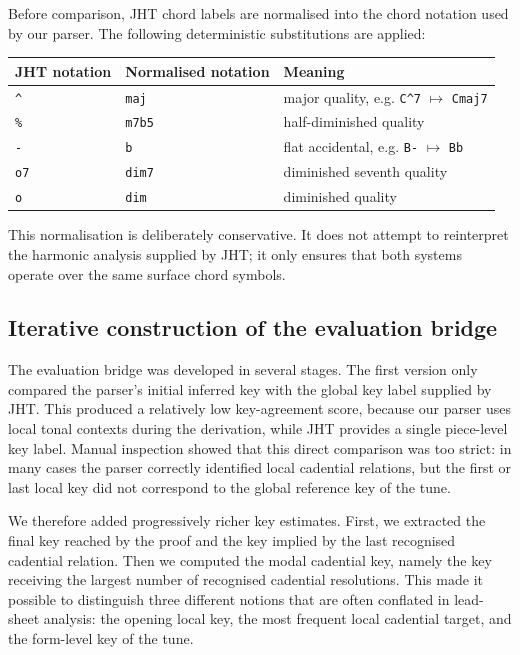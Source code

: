 Before comparison, JHT chord labels are normalised into the chord notation used
by our parser. The following deterministic substitutions are applied:

\begin{center}
\begin{tabular}{lll}
\hline
JHT notation & Normalised notation & Meaning \\
\hline
\texttt{\^{}} & \texttt{maj} & major quality, e.g. \texttt{C\^{}7} $\mapsto$ \texttt{Cmaj7} \\
\texttt{\%} & \texttt{m7b5} & half-diminished quality \\
\texttt{-} & \texttt{b} & flat accidental, e.g. \texttt{B-} $\mapsto$ \texttt{Bb} \\
\texttt{o7} & \texttt{dim7} & diminished seventh quality \\
\texttt{o} & \texttt{dim} & diminished quality \\
\hline
\end{tabular}
\end{center}

This normalisation is deliberately conservative. It does not attempt to
reinterpret the harmonic analysis supplied by JHT; it only ensures that both
systems operate over the same surface chord symbols.

\subsection{Iterative construction of the evaluation bridge}

The evaluation bridge was developed in several stages. The first version only
compared the parser's initial inferred key with the global key label supplied
by JHT. This produced a relatively low key-agreement score, because our parser
uses local tonal contexts during the derivation, while JHT provides a single
piece-level key label. Manual inspection showed that this direct comparison was
too strict: in many cases the parser correctly identified local cadential
relations, but the first or last local key did not correspond to the global
reference key of the tune.

We therefore added progressively richer key estimates. First, we extracted the
final key reached by the proof and the key implied by the last recognised
cadential relation. Then we computed the modal cadential key, namely the key
receiving the largest number of recognised cadential resolutions. This made it
possible to distinguish three different notions that are often conflated in
lead-sheet analysis: the opening local key, the most frequent local cadential
target, and the form-level key of the tune.

